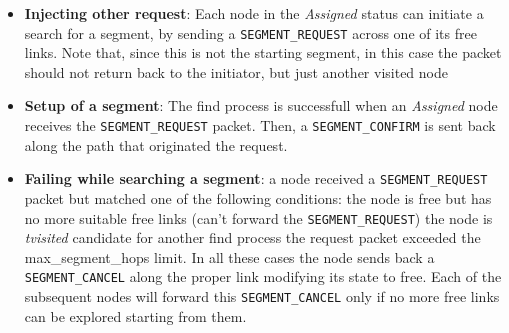 \begin{itemize}

\item{\textbf{Injecting other request}}: Each node in the \emph{Assigned} status can initiate a search for a
segment, by sending a \texttt{SEGMENT\_REQUEST} across one of its free
links. Note that, since this is not the starting segment, in this case
the packet should not return back to the initiator, but just another visited
node
\item{\textbf{Setup of a segment}}: The find process is successfull
when an \emph{Assigned} node receives the \texttt{SEGMENT\_REQUEST} packet. Then, a \texttt{SEGMENT\_CONFIRM} is
sent back along the path that originated the request.  
\item{\textbf{Failing while searching a segment}}: a node received a \texttt{SEGMENT\_REQUEST} packet but
matched one of the following conditions: the node is free but has no
more suitable free links (can’t forward the \texttt{SEGMENT\_REQUEST}) the node
is \emph{tvisited} candidate for another find process the request packet
exceeded the max\_segment\_hops limit.  In all these cases the node
sends back a \texttt{SEGMENT\_CANCEL} along the proper link modifying its state
to free. Each of the subsequent nodes will forward this \texttt{SEGMENT\_CANCEL}
only if no more free links can be explored starting from them.
\end{itemize}




